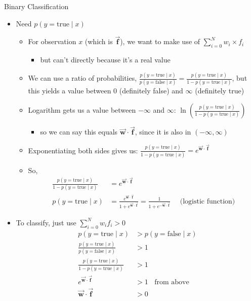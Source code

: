 \documentclass[11pt,letterpaper]{article}
\newcommand{\vv}[1]{\ensuremath{\vec{\mathbf{#1}}}}
\begin{document}
Binary Classification

\begin{itemize}
  \item Need $p(y=\text{true} \mid x)$
    \begin{itemize}
      \item For observation $x$ (which is \vv{f}), we want to make use of $\sum_{i=0}^N w_i \times f_i$
         \begin{itemize}
           \item but can't directly because it's a real value
         \end{itemize}
      \item We can use a ratio of probabilities, $\frac{p(y=\text{true} \mid x)}{p(y=\text{false} \mid x)} = \frac{p(y=\text{true} \mid x)}{1-p(y=\text{true} \mid x)}$, but this yields a value between 0 (definitely false) and $\infty$ (definitely true)
      \item Logarithm gets us a value between $-\infty$ and $\infty$: $\ln(\frac{p(y=\text{true} \mid x)}{1-p(y=\text{true} \mid x)})$
        \begin{itemize}
           \item so we can say this equals $\vv{w} \cdot \vv{f}$, since it is also in $(-\infty, \infty)$
        \end{itemize}
      \item Exponentiating both sides gives us: $\frac{p(y=\text{true} \mid x)}{1-p(y=\text{true} \mid x)} = e^{\vv{w} \cdot \vv{f}}$
      \item So, \vspace{-5mm}
        \begin{align*} 
          \frac{p(y=\text{true} \mid x)}{1-p(y=\text{true} \mid x)} &= e^{\vv{w} \cdot \vv{f}} \\
          p(y=\text{true} \mid x) &= \frac{e^{\vv{w} \cdot \vv{f}}}{1+e^{\vv{w} \cdot \vv{f}}}
                                   = \frac{1}{1+e^{-\vv{w} \cdot \vv{f}}} \text{~~~~(logistic function)}
        \end{align*}
    \end{itemize}
  \item To classify, just use $\sum_{i=0}^N w_i f_i > 0$
        \begin{align*} 
          p(y=\text{true}\mid x) &> p(y=\text{false}\mid x) \\
          \frac{p(y=\text{true}\mid x)}{p(y=\text{false}\mid x)} &> 1 \\
          \frac{p(y=\text{true}\mid x)}{1-p(y=\text{true}\mid x)} &> 1 \\
          e^{\vv{w} \cdot \vv{f}} &> 1  ~~~~\text{from above} \\
          \vv{w} \cdot \vv{f} &> 0
         \end{align*}
\end{itemize}
\end{document}
